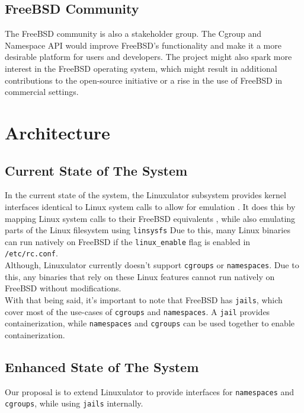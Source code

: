 \documentclass[12pt, dvipsnames, a4paper]{article}
\begin{document}
\subsection{FreeBSD Community}
The FreeBSD community is also a stakeholder group. The Cgroup and Namespace API would improve FreeBSD's functionality and make it a more desirable platform for users and developers. The project might also spark more interest in the FreeBSD operating system, which might result in additional contributions to the open-source initiative or a rise in the use of FreeBSD in commercial settings.

\section{Architecture}
\subsection{Current State of The System}

In the current state of the system, the Linuxulator subsystem provides kernel
interfaces identical to Linux system calls to allow for emulation \cite{linuxbinarycompat}.
It does this by mapping Linux system calls to their FreeBSD equivalents \cite{linuxulator},
while also emulating parts of the Linux filesystem using \texttt{linsysfs} \cite{linsysfs}
Due to this, many Linux binaries can run natively on FreeBSD if the
\texttt{linux\_enable} flag is enabled in \texttt{/etc/rc.conf}.\\

Although, Linuxulator currently doesn't support \texttt{cgroups} or \texttt{namespaces}.
Due to this, any binaries that rely on these Linux features cannot run
natively on FreeBSD without modifications.\\

With that being said, it's important to note that FreeBSD has \texttt{jails},
which cover most of the use-cases of \texttt{cgroups} and \texttt{namespaces}.
A \texttt{jail} provides containerization, while \texttt{namespaces} and \texttt{cgroups}
can be used together to enable containerization.

\subsection{Enhanced State of The System}

Our proposal is to extend Linuxulator to provide interfaces for \texttt{namespaces}
and \texttt{cgroups}, while using \texttt{jails} internally.\\
\end{document}
